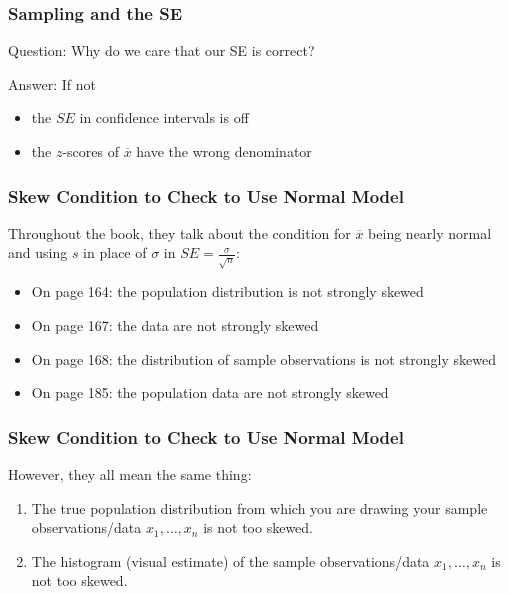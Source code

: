 \documentclass[handout]{beamer}
\newcommand{\blue}[1]{\textcolor{blue2}{#1}}
\newcommand{\xbar}{\overline{x}}
\begin{document}
\begin{frame}[fragile]
\frametitle{Sampling and the SE}
\blue{Question}:  Why do we care that our SE is correct?

\pause\vspace{0.5cm}

\blue{Answer}:  If not
\begin{itemize}
\item the $SE$ in confidence intervals is off
\item the $z$-scores of $\xbar$ have the wrong denominator
\end{itemize}

\end{frame}


\begin{frame}
\frametitle{Skew Condition to Check to Use Normal Model}
Throughout the book, they talk about the condition for $\xbar$ being nearly normal and using $s$ in place of $\sigma$ in $SE=\frac{\sigma}{\sqrt{n}}$:

\vspace{0.25cm}

\begin{itemize}
\pause\item On page 164: the population distribution is not strongly skewed
\pause\item On page 167: the data are not strongly skewed
\pause\item On page 168: the distribution of sample observations is not strongly skewed
\pause\item On page 185: the population data are not strongly skewed
\end{itemize}

\end{frame}


\begin{frame}
\frametitle{Skew Condition to Check to Use Normal Model}
However, they all mean the same thing:

\begin{enumerate}
\pause\item The \blue{true population} distribution from which you are drawing your sample observations/data $x_1, \ldots, x_n$ is not too skewed.  
\pause\item The histogram (visual estimate) of the sample observations/data $x_1, \ldots, x_n$ is not too skewed.  
\end{enumerate}

\end{frame}
\end{document}
